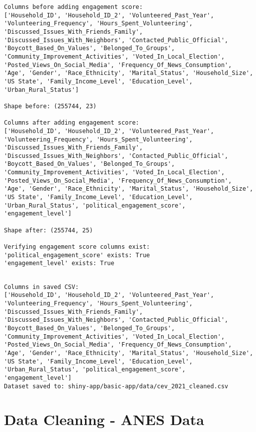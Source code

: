 \documentclass[
  letterpaper,
  DIV=11,
  numbers=noendperiod]{scrartcl}
\begin{document}
\begin{verbatim}
Columns before adding engagement score:
['Household_ID', 'Household_ID_2', 'Volunteered_Past_Year', 'Volunteering_Frequency', 'Hours_Spent_Volunteering', 'Discussed_Issues_With_Friends_Family', 'Discussed_Issues_With_Neighbors', 'Contacted_Public_Official', 'Boycott_Based_On_Values', 'Belonged_To_Groups', 'Community_Improvement_Activities', 'Voted_In_Local_Election', 'Posted_Views_On_Social_Media', 'Frequency_Of_News_Consumption', 'Age', 'Gender', 'Race_Ethnicity', 'Marital_Status', 'Household_Size', 'US State', 'Family_Income_Level', 'Education_Level', 'Urban_Rural_Status']

Shape before: (255744, 23)

Columns after adding engagement score:
['Household_ID', 'Household_ID_2', 'Volunteered_Past_Year', 'Volunteering_Frequency', 'Hours_Spent_Volunteering', 'Discussed_Issues_With_Friends_Family', 'Discussed_Issues_With_Neighbors', 'Contacted_Public_Official', 'Boycott_Based_On_Values', 'Belonged_To_Groups', 'Community_Improvement_Activities', 'Voted_In_Local_Election', 'Posted_Views_On_Social_Media', 'Frequency_Of_News_Consumption', 'Age', 'Gender', 'Race_Ethnicity', 'Marital_Status', 'Household_Size', 'US State', 'Family_Income_Level', 'Education_Level', 'Urban_Rural_Status', 'political_engagement_score', 'engagement_level']

Shape after: (255744, 25)

Verifying engagement score columns exist:
'political_engagement_score' exists: True
'engagement_level' exists: True
\end{verbatim}

\begin{verbatim}

Columns in saved CSV:
['Household_ID', 'Household_ID_2', 'Volunteered_Past_Year', 'Volunteering_Frequency', 'Hours_Spent_Volunteering', 'Discussed_Issues_With_Friends_Family', 'Discussed_Issues_With_Neighbors', 'Contacted_Public_Official', 'Boycott_Based_On_Values', 'Belonged_To_Groups', 'Community_Improvement_Activities', 'Voted_In_Local_Election', 'Posted_Views_On_Social_Media', 'Frequency_Of_News_Consumption', 'Age', 'Gender', 'Race_Ethnicity', 'Marital_Status', 'Household_Size', 'US State', 'Family_Income_Level', 'Education_Level', 'Urban_Rural_Status', 'political_engagement_score', 'engagement_level']
Dataset saved to: shiny-app/basic-app/data/cev_2021_cleaned.csv
\end{verbatim}

\section{Data Cleaning - ANES Data}\label{data-cleaning---anes-data}
\end{document}
